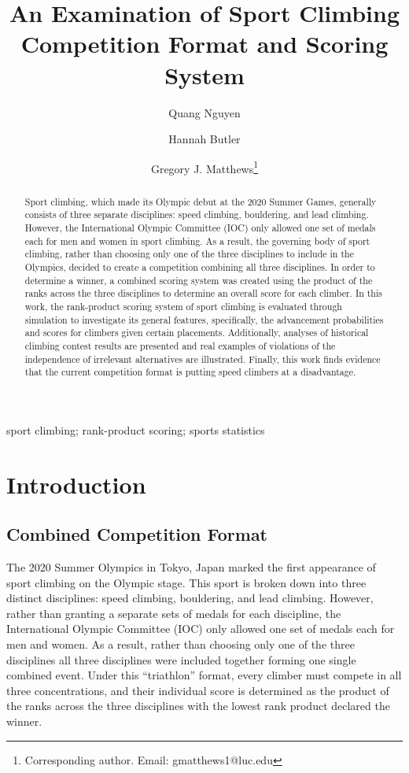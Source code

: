 \documentclass[letterpaper, inpress]{jds} %
\title[An Examination of Sport Climbing]{An Examination of Sport Climbing Competition Format and Scoring System}
\author[1]{Quang Nguyen}
\author[2]{Hannah Butler}
\author[1]{Gregory J. Matthews\footnote{Corresponding author. Email: gmatthews1@luc.edu}}
\affil[1]{Department of Mathematics and Statistics, Loyola University Chicago, Chicago, IL, USA}
\affil[2]{Department of Statistics, Colorado State University, Fort Collins, CO, USA}
\begin{document}
\maketitle
\begin{abstract}
Sport climbing, which made its Olympic debut at the 2020 Summer Games, generally consists of three separate disciplines: speed climbing, bouldering, and lead climbing. However, the International Olympic Committee (IOC) only allowed one set of medals each for men and women in sport climbing. As a result, the governing body of sport climbing, rather than choosing only one of the three disciplines to include in the Olympics, decided to create a competition combining all three disciplines. In order to determine a winner, a combined scoring system was created using the product of the ranks across the three disciplines to determine an overall score for each climber. In this work, the rank-product scoring system of sport climbing is evaluated through simulation to investigate its general features, specifically, the advancement probabilities and scores for climbers given certain placements. Additionally, analyses of historical climbing contest results are presented and real examples of violations of the independence of irrelevant alternatives are illustrated. Finally, this work finds evidence that the current competition format is putting speed climbers at a disadvantage.\@
\end{abstract}

\begin{keywords} %
sport climbing; rank-product scoring; sports statistics
\end{keywords}

\section{Introduction}
\label{sec:sec1}

\subsection{Combined Competition Format}
\label{sec1pt1}

The 2020 Summer Olympics in Tokyo, Japan marked the first appearance of
sport climbing on the Olympic stage. This sport is broken down into
three distinct disciplines: speed climbing, bouldering, and lead
climbing. However, rather than granting a separate sets of medals for
each discipline, the International Olympic Committee (IOC) only allowed
one set of medals each for men and women. As a result, rather than
choosing only one of the three disciplines all three disciplines were
included together forming one single combined event. Under this
``triathlon'' format, every climber must compete in all three
concentrations, and their individual score is determined as the product
of the ranks across the three disciplines with the lowest rank product
declared the winner.
\end{document}
